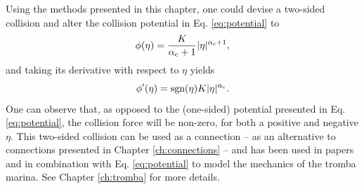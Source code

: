 % 

Using the methods presented in this chapter, one could devise a two-sided collision and alter the collision potential in Eq. \eqref{eq:potential} to \cite{Bilbao2019}
\begin{equation}\label{eq:twoSidedPotential}
    \phi(\eta) = \frac{K}{\alpha_{\text{c}}+1}|\eta|^{\alpha_{\text{c}}+1},
\end{equation}
and taking its derivative with respect to $\eta$ yields
\begin{equation}
    \phi'(\eta) = \text{sgn}(\eta)K|\eta|^{\alpha_{\text{c}}}.
\end{equation}
One can observe that, as opposed to the (one-sided) potential presented in Eq. \eqref{eq:potential}, the collision force will be non-zero, for both a positive and negative $\eta$. This two-sided collision can be used as a connection -- as an alternative to connections presented in Chapter \ref{ch:connections} -- and has been used in papers \citeP[D] and \citeP[E] in combination with Eq. \eqref{eq:potential} to model the mechanics of the tromba marina. See Chapter \ref{ch:tromba} for more details.